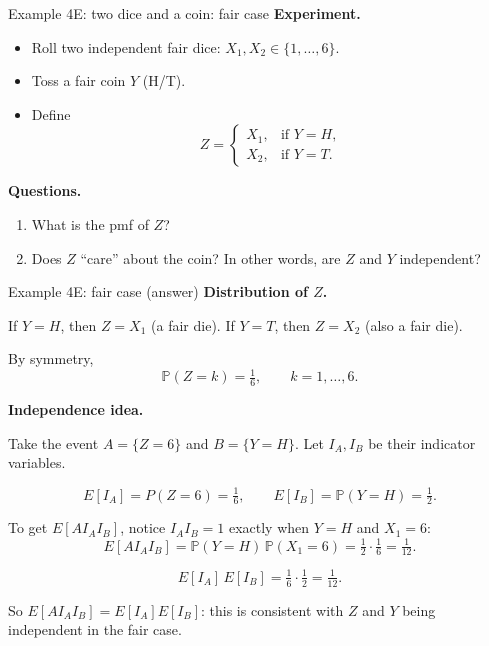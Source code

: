\documentclass[t,8pt]{beamer}
\begin{document}
\begin{frame}{Example 4E: two dice and a coin: fair case}
	\small
	\textbf{Experiment.}
	\begin{itemize}
		\item Roll two independent fair dice: $X_1, X_2 \in \{1,\dots,6\}$.
		\item Toss a fair coin $Y$ (H/T).
		\item Define
		\[
		Z =
		\begin{cases}
			X_1, & \text{if } Y = H,\\
			X_2, & \text{if } Y = T.
		\end{cases}
		\]
	\end{itemize}
	
	\medskip
	\textbf{Questions.}
	\begin{enumerate}
		\item What is the pmf of $Z$?
		\item Does $Z$ “care” about the coin?  
		In other words, are $Z$ and $Y$ independent?
	\end{enumerate}
\end{frame}

\begin{frame}{Example 4E: fair case (answer)}
	\small
	\textbf{Distribution of $Z$.}
	
	If $Y=H$, then $Z=X_1$ (a fair die).  
	If $Y=T$, then $Z=X_2$ (also a fair die).
	
	\medskip
	By symmetry,
	\[
	\mathbb P(Z=k) = \tfrac16,\qquad k=1,\dots,6.
	\]
	
	\medskip
	\textbf{Independence idea.}
	
	Take the event $A=\{Z=6\}$ and $B=\{Y=H\}$.  
	Let $I_A, I_B$ be their indicator variables.
	
	\[
	E[I_A] = P(Z=6) = \tfrac16,\qquad
	E[I_B] = \mathbb P(Y=H) = \tfrac12.
	\]
	
	\medskip
	To get $E[AI_A I_B]$, notice $I_A I_B = 1$ exactly when $Y=H$ and $X_1=6$:
	\[
	E[AI_A I_B]
	= \mathbb P(Y=H)\,\mathbb P(X_1=6)
	= \tfrac12 \cdot \tfrac16
	= \tfrac{1}{12}.
	\]
	
	\[
	E[I_A]\,E[I_B]
	= \tfrac16 \cdot \tfrac12
	= \tfrac{1}{12}.
	\]
	
	So $E[AI_A I_B] = E[I_A]E[I_B]$:  
	this is consistent with $Z$ and $Y$ being independent in the fair case.
\end{frame}
\end{document}
